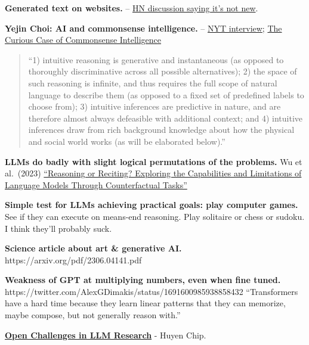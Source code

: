 \documentclass[
  11pt,
  letterpaper,
  DIV=11,
  numbers=noendperiod,
  oneside]{scrartcl}
\begin{document}
\textbf{Generated text on websites.} --
\href{https://news.ycombinator.com/item?id=36514063}{HN discussion
saying it's not new}.

\textbf{Yejin Choi: AI and commonsense intelligence.} --
\href{https://www.nytimes.com/interactive/2022/12/26/magazine/yejin-choi-interview.html}{NYT
interview};
\href{https://www.amacad.org/publication/curious-case-commonsense-intelligence}{The
Curious Case of Commonsense Intelligence}

\begin{quote}
``1) intuitive reasoning is generative and instantaneous (as opposed to
thoroughly discriminative across all possible alternatives); 2) the
space of such reasoning is infinite, and thus requires the full scope of
natural language to describe them (as opposed to a fixed set of
predefined labels to choose from); 3) intuitive inferences are
predictive in nature, and are therefore almost always defeasible with
additional context; and 4) intuitive inferences draw from rich
background knowledge about how the physical and social world works (as
will be elaborated below).''
\end{quote}

\textbf{LLMs do badly with slight logical permutations of the problems.}
Wu et al.~(2023) \href{https://arxiv.org/pdf/2307.02477.pdf}{``Reasoning
or Reciting? Exploring the Capabilities and Limitations of Language
Models Through Counterfactual Tasks''}

\textbf{Simple test for LLMs achieving practical goals: play computer
games.} See if they can execute on means-end reasoning. Play solitaire
or chess or sudoku. I think they'll probably suck.

\textbf{Science article about art \& generative AI.}
https://arxiv.org/pdf/2306.04141.pdf

\textbf{Weakness of GPT at multiplying numbers, even when fine tuned.}
https://twitter.com/AlexGDimakis/status/1691600985938858432
``Transformers have a hard time because they learn linear patterns that
they can memorize, maybe compose, but not generally reason with.''

\textbf{\href{https://huyenchip.com/2023/08/16/llm-research-open-challenges.html\#1_reduce_and_measure_hallucinations}{Open
Challenges in LLM Research}} - Huyen Chip.
\end{document}
